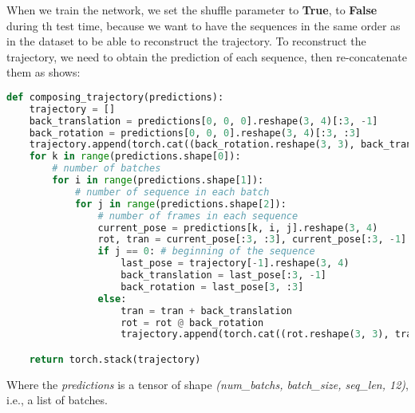 When we train the network, we set the shuffle parameter to \textbf{True}, to \textbf{False} during th test time, because we want to have the sequences in the same order as in the dataset to be able to reconstruct the trajectory.
To reconstruct the trajectory, we need to obtain the prediction of each sequence, then re-concatenate them as  shows:
\begin{lstlisting}[captionpos=b, language=python,label={lst:reconstruct-trajectory}, caption ={Reconstruct the trajectory from the predictions which is a list of batches of sequences.}]
def composing_trajectory(predictions):
    trajectory = []
    back_translation = predictions[0, 0, 0].reshape(3, 4)[:3, -1]
    back_rotation = predictions[0, 0, 0].reshape(3, 4)[:3, :3]
    trajectory.append(torch.cat((back_rotation.reshape(3, 3), back_translation.reshape(3, 1)), dim=1).flatten())
    for k in range(predictions.shape[0]):
        # number of batches
        for i in range(predictions.shape[1]):
            # number of sequence in each batch
            for j in range(predictions.shape[2]):
                # number of frames in each sequence
                current_pose = predictions[k, i, j].reshape(3, 4)
                rot, tran = current_pose[:3, :3], current_pose[:3, -1]
                if j == 0: # beginning of the sequence
                    last_pose = trajectory[-1].reshape(3, 4)
                    back_translation = last_pose[:3, -1]
                    back_rotation = last_pose[3, :3]
                else:
                    tran = tran + back_translation
                    rot = rot @ back_rotation
                    trajectory.append(torch.cat((rot.reshape(3, 3), tran.reshape(3, 1)), dim=1).flatten())

    return torch.stack(trajectory)
\end{lstlisting}
Where the \textit{predictions} is a tensor of shape \textit{(num\_batchs, batch\_size, seq\_len, 12)}, i.e., a list of batches.
